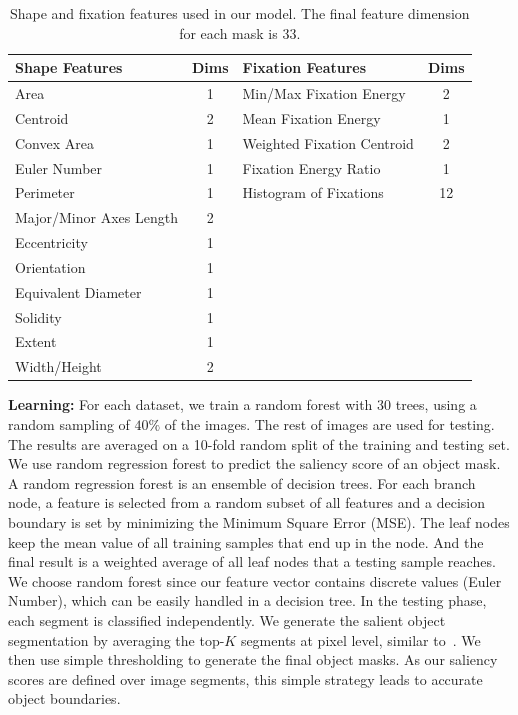 \begin{table}
\begin{center}
\begin{tabular} {| l | c || l | c |}
\hline
\textbf{Shape Features} & Dims & \textbf{Fixation Features} & Dims\\
\hline
Area & 1 & Min/Max Fixation Energy & 2\\
\hline
Centroid &  2 & Mean Fixation Energy & 1\\
\hline
Convex Area & 1 & Weighted Fixation Centroid & 2\\
\hline
Euler Number & 1 & Fixation Energy Ratio & 1\\
\hline
Perimeter & 1 & Histogram of Fixations & 12 \\
\hline
Major/Minor Axes Length & 2 & &\\
\hline
Eccentricity & 1 & &\\
\hline
Orientation & 1 & &\\
\hline
Equivalent Diameter & 1 & &\\
\hline
Solidity & 1 & &\\
\hline
Extent & 1 & &\\
\hline
Width/Height & 2 & &\\
\hline
\end{tabular}
\caption{Shape and fixation features used in our model. The final feature dimension for each mask is $33$.} \label{tab:feat}
\end{center}
\end{table}

\textbf{Learning:}  For each dataset, we train a random forest with 30 trees, using a random sampling of $40\%$ of the images. The rest of images are used for testing. The results are averaged on a 10-fold random split of the training and testing set. We use random regression forest to predict the saliency score of an object mask. A random regression forest is an ensemble of decision trees. For each branch node, a feature is selected from a random subset of all features and a decision boundary is set by minimizing the Minimum Square Error (MSE).  The leaf nodes keep the mean value of all training samples that end up in the node. And the final result is a weighted average of all leaf nodes that a testing sample reaches. We choose random forest since our feature vector contains discrete values (Euler Number), which can be easily handled in a decision tree. In the testing phase, each segment is classified independently. We generate the salient object segmentation by averaging the top-$K$ segments at pixel level, similar to~\cite{carreira2010constrained}. We then use simple thresholding to generate the final object masks. As our saliency scores are defined over image segments, this simple strategy leads to accurate object boundaries.

